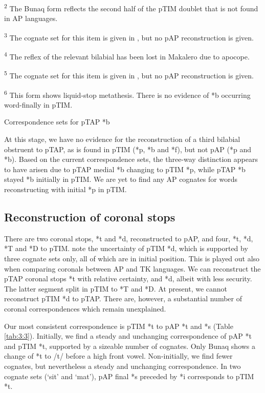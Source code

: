 \documentclass[output=paper]{LSP/langsci}
\begin{document}
\begin{sidewaystable}
\begin{flushleft}
\textsuperscript{2} The Bunaq form reflects the second half of the pTIM doublet that is not found in AP languages.

\textsuperscript{3} The cognate set for this item is given in \citet{HoltonEtAl2012}, but no pAP reconstruction is given.

\textsuperscript{4} The reflex of the relevant bilabial has been lost in Makalero due to apocope.

\textsuperscript{5} The cognate set for this item is given in \citet{HoltonEtAl2012}, but no pAP reconstruction is given.

\textsuperscript{6} This form shows liquid-stop metathesis. There is no evidence of *b occurring word-finally in pTIM.
\end{flushleft}
\caption{Correspondence sets for pTAP *b}
\label{tab:3:2}
\end{sidewaystable}



At this stage, we have no evidence for the reconstruction of a third bilabial obstruent to pTAP, as is found in pTIM (*p, *b and *f), but not pAP (*p and *b). Based on the current correspondence sets, the three-way distinction appears to have arisen due to pTAP medial *b changing to pTIM *p, while pTAP *b stayed *b initially in pTIM. We are yet to find any AP cognates for words reconstructing with initial *p in pTIM.

\subsection{Reconstruction of coronal stops}
There are two coronal stops, *t and *d, reconstructed to pAP, and four, *t, *d, *T and *D to pTIM. \citet{SchapperEtAl2012} note the uncertainty of pTIM *d, which is supported by three cognate sets only, all of which are in initial position. This is played out also when comparing coronals between AP and TK languages. We can reconstruct the pTAP coronal stops *t with relative certainty, and *d, albeit with less security. The latter segment split in pTIM to *T and *D. At present, we cannot reconstruct pTIM *d to pTAP. There are, however, a substantial number of coronal correspondences which remain unexplained. 

Our most consistent correspondence is pTIM *t to pAP *t and *s (Table \ref{tab:3:3}). Initially, we find a steady and unchanging correspondence of pAP *t and pTIM *t, supported by a sizeable number of cognates. Only Bunaq shows a change of *t to /t{\textesh}/ before a high front vowel. Non-initially, we find fewer cognates, but nevertheless a steady and unchanging correspondence. In two cognate sets (`sit' and `mat'), pAP final *s preceded by *i corresponds to pTIM *t.
 
\end{document}
